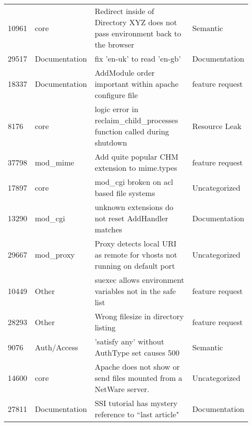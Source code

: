 \begin{longtable}[c]{llll}
10961  & core               & Redirect inside of Directory XYZ does not pass environment back to the browser            & Semantic          \\
29517  & Documentation      & fix 'en-uk' to read 'en-gb'                                                                                    & Documentation     \\
18337  & Documentation      & AddModule order important within apache configure file                                                         & feature request   \\
8176   & core               & logic error in reclaim\_child\_processes function called during shutdown                                       & Resource Leak     \\
37798  & mod\_mime          & Add quite popular CHM extension to mime.types                                                                  & feature request   \\
17897  & core               & mod\_cgi broken on acl based file systems                                                                      & Uncategorized     \\
13290  & mod\_cgi           & unknown extensions do not reset AddHandler matches                                                             & Documentation     \\
29667  & mod\_proxy         & Proxy detects local URI as remote for vhosts not running on default port                                       & Uncategorized     \\
10449  & Other              & suexec allows environment variables not in the safe list                                                       & feature request   \\
28293  & Other              & Wrong filesize in directory listing                                                                            & feature request   \\
9076   & Auth/Access        & 'satisfy any' without AuthType set causes 500                                                                  & Semantic          \\
14600  & core               & Apache does not show or send files mounted from a NetWare server.                                              & Uncategorized     \\
27811  & Documentation      & SSI tutorial has mystery reference to ``last article"                                                           & Documentation     \\

\end{longtable}
